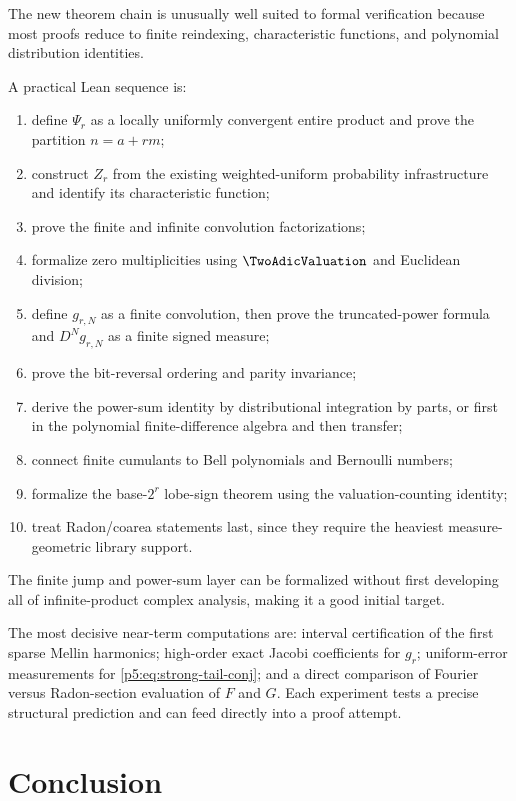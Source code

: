 \documentclass[11pt]{article}
\theoremstyle{definition}
\theoremstyle{remark}
\begin{document}
The new theorem chain is unusually well suited to formal verification because
most proofs reduce to finite reindexing, characteristic functions, and
polynomial distribution identities.

A practical Lean sequence is:
\begin{enumerate}
\item define $\Psi_r$ as a locally uniformly convergent entire product and
      prove the partition $n=a+rm$;
\item construct $Z_r$ from the existing weighted-uniform probability
      infrastructure and identify its characteristic function;
\item prove the finite and infinite convolution factorizations;
\item formalize zero multiplicities using $\TwoAdicValuation$ and Euclidean division;
\item define $g_{r,N}$ as a finite convolution, then prove the truncated-power
      formula and $D^Ng_{r,N}$ as a finite signed measure;
\item prove the bit-reversal ordering and parity invariance;
\item derive the power-sum identity by distributional integration by parts,
      or first in the polynomial finite-difference algebra and then transfer;
\item connect finite cumulants to Bell polynomials and Bernoulli numbers;
\item formalize the base-$2^r$ lobe-sign theorem using the valuation-counting
      identity;
\item treat Radon/coarea statements last, since they require the heaviest
      measure-geometric library support.
\end{enumerate}
The finite jump and power-sum layer can be formalized without first developing
all of infinite-product complex analysis, making it a good initial target.

\begin{frontierbox}
The most decisive near-term computations are: interval certification of the
first sparse Mellin harmonics; high-order exact Jacobi coefficients for
$g_r$; uniform-error measurements for \eqref{p5:eq:strong-tail-conj}; and a direct
comparison of Fourier versus Radon-section evaluation of $F$ and $G$.  Each
experiment tests a precise structural prediction and can feed directly into a
proof attempt.
\end{frontierbox}

\section{Conclusion}
\label{p5:sec:conclusion}
\end{document}
